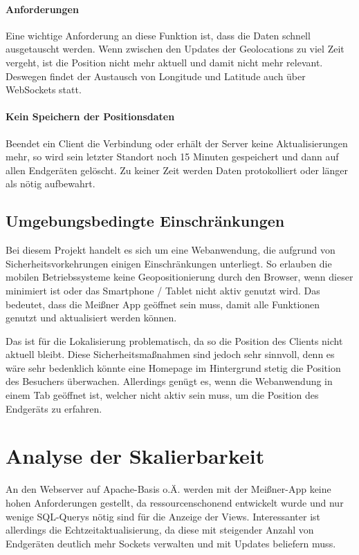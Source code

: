 \paragraph{Anforderungen}
Eine wichtige Anforderung an diese Funktion ist, dass die Daten schnell ausgetauscht werden. Wenn zwischen den Updates der Geolocations zu viel Zeit vergeht, ist die Position nicht mehr aktuell und damit nicht mehr relevant. Deswegen findet der Austausch von Longitude und Latitude auch über WebSockets statt.

\paragraph{Kein Speichern der Positionsdaten}
Beendet ein Client die Verbindung oder erhält der Server keine Aktualisierungen mehr, so wird sein letzter Standort noch 15 Minuten gespeichert und dann auf allen Endgeräten gelöscht. Zu keiner Zeit werden Daten protokolliert oder länger als nötig aufbewahrt.

\subsection{Umgebungsbedingte Einschränkungen}
Bei diesem Projekt handelt es sich um eine Webanwendung, die aufgrund von Sicherheitsvorkehrungen einigen Einschränkungen unterliegt. So erlauben die mobilen Betriebssysteme keine Geopositionierung durch den Browser, wenn dieser minimiert ist oder das Smartphone / Tablet nicht aktiv genutzt wird. Das bedeutet, dass die Meißner App geöffnet sein muss, damit alle Funktionen genutzt und aktualisiert werden können.\par

Das ist für die Lokalisierung problematisch, da so die Position des Clients nicht aktuell bleibt. Diese Sicherheitsmaßnahmen sind jedoch sehr sinnvoll, denn es wäre sehr bedenklich könnte eine Homepage im Hintergrund stetig die Position des Besuchers überwachen. Allerdings genügt es, wenn die Webanwendung in einem Tab geöffnet ist, welcher nicht aktiv sein muss, um die Position des Endgeräts zu erfahren.


\section{Analyse der Skalierbarkeit}
An den Webserver auf Apache-Basis o.Ä. werden mit der Meißner-App keine hohen Anforderungen gestellt, da ressourcenschonend entwickelt wurde und nur wenige SQL-Querys nötig sind für die Anzeige der Views. Interessanter ist allerdings die Echtzeitaktualisierung, da diese mit steigender Anzahl von Endgeräten deutlich mehr Sockets verwalten und mit Updates beliefern muss.

